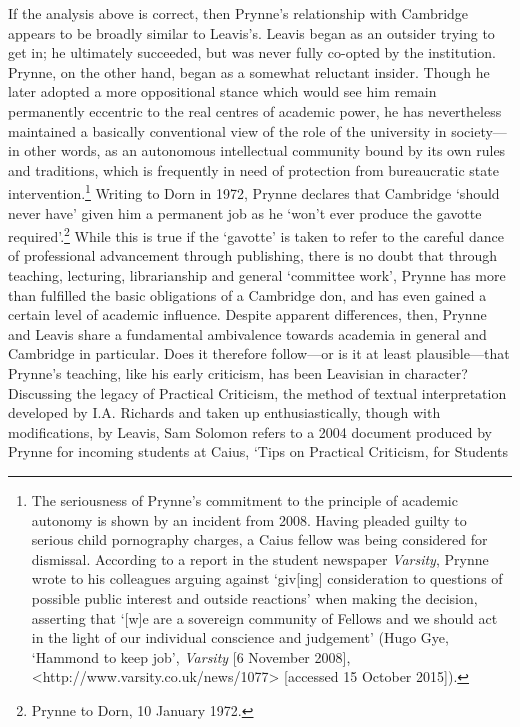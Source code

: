 \documentclass[]{article}
\begin{document}
If the analysis above is correct, then Prynne’s relationship with
Cambridge appears to be broadly similar to Leavis’s. Leavis began as an
outsider trying to get in; he ultimately succeeded, but was never fully
co-opted by the institution. Prynne, on the other hand, began as a
somewhat reluctant insider. Though he later adopted a more oppositional
stance which would see him remain permanently eccentric to the real
centres of academic power, he has nevertheless maintained a basically
conventional view of the role of the university in society—in other
words, as an autonomous intellectual community bound by its own rules
and traditions, which is frequently in need of protection from
bureaucratic state intervention.\footnote{The seriousness of Prynne’s
  commitment to the principle of academic autonomy is shown by an
  incident from 2008. Having pleaded guilty to serious child pornography
  charges, a Caius fellow was being considered for dismissal. According
  to a report in the student newspaper \emph{Varsity}, Prynne wrote to
  his colleagues arguing against ‘giv{[}ing{]} consideration to
  questions of possible public interest and outside reactions’ when
  making the decision, asserting that ‘{[}w{]}e are a sovereign
  community of Fellows and we should act in the light of our individual
  conscience and judgement’ (Hugo Gye, ‘Hammond to keep job’,
  \emph{Varsity} {[}6 November 2008{]},
  \textless{}http://www.varsity.co.uk/news/1077\textgreater{}
  {[}accessed 15 October 2015{]}).} Writing to Dorn in 1972, Prynne
declares that Cambridge ‘should never have’ given him a permanent job as
he ‘won’t ever produce the gavotte required’.\footnote{Prynne to Dorn,
  10 January 1972.} While this is true if the ‘gavotte’ is taken to
refer to the careful dance of professional advancement through
publishing, there is no doubt that through teaching, lecturing,
librarianship and general ‘committee work’, Prynne has more than
fulfilled the basic obligations of a Cambridge don, and has even gained
a certain level of academic influence. Despite apparent differences,
then, Prynne and Leavis share a fundamental ambivalence towards academia
in general and Cambridge in particular. Does it therefore follow—or is
it at least plausible—that Prynne’s teaching, like his early criticism,
has been Leavisian in character? Discussing the legacy of Practical
Criticism, the method of textual interpretation developed by I.A.
Richards and taken up enthusiastically, though with modifications, by
Leavis, Sam Solomon refers to a 2004 document produced by Prynne for
incoming students at Caius, ‘Tips on Practical Criticism, for Students
\end{document}

